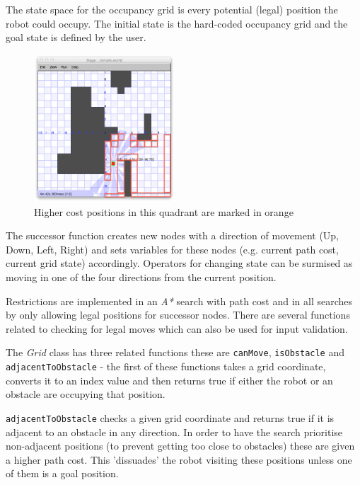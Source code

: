 \documentclass[a4paper,12pt]{article}
\begin{document}
The state space for the occupancy grid is every potential (legal) position the robot could occupy. The initial state is the hard-coded occupancy grid and the goal state is defined by the user.
\begin{figure}
    \begin{center}
            \includegraphics[width=0.47\textwidth]{images/Path_Cost_Grid.png}
            \caption{Higher cost positions in this quadrant are marked in orange}
    \end{center}
\end{figure}

The successor function creates new nodes with a direction of movement (Up, Down, Left, Right) and sets variables for these nodes (e.g. current path cost, current grid state) accordingly. Operators for changing state can be surmised as moving in one of the four directions from the current position. 

Restrictions are implemented in an \textit{A*} search with path cost and in all searches by only allowing legal positions for successor nodes. There are several functions related to checking for legal moves which can also be used for input validation.

The \textit{Grid} class has three related functions these are \texttt{canMove}, \texttt{isObstacle} and \texttt{adjacentToObstacle} - the first of these functions takes a grid coordinate, converts it to an index value and then returns true if either the robot or an obstacle are occupying that position.

\texttt{adjacentToObstacle} checks a given grid coordinate and returns true if it is adjacent to an obstacle in any direction. In order to have the search prioritise non-adjacent positions (to prevent getting too close to obstacles) these are given a higher path cost. This 'dissuades' the robot visiting these positions unless one of them is a goal position.
\end{document}
